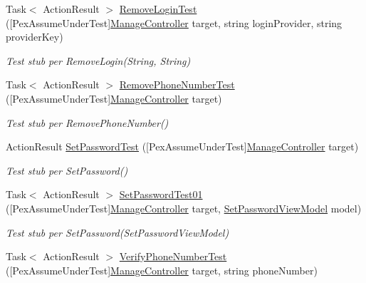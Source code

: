 \begin{DoxyCompactItemize}
Task$<$ Action\+Result $>$ \mbox{\hyperlink{class_brew_day2_1_1_tests_1_1_manage_controller_test_aa23d7412cfef8dd01b2a836cfd018265}{Remove\+Login\+Test}} (\mbox{[}Pex\+Assume\+Under\+Test\mbox{]}\mbox{\hyperlink{class_brew_day2_1_1_controllers_1_1_manage_controller}{Manage\+Controller}} target, string login\+Provider, string provider\+Key)
\begin{DoxyCompactList}\small\item\em Test stub per Remove\+Login(\+String, String)\end{DoxyCompactList}\item 
Task$<$ Action\+Result $>$ \mbox{\hyperlink{class_brew_day2_1_1_tests_1_1_manage_controller_test_a746f27b8cb41891df480fd36d6a0dcfd}{Remove\+Phone\+Number\+Test}} (\mbox{[}Pex\+Assume\+Under\+Test\mbox{]}\mbox{\hyperlink{class_brew_day2_1_1_controllers_1_1_manage_controller}{Manage\+Controller}} target)
\begin{DoxyCompactList}\small\item\em Test stub per Remove\+Phone\+Number()\end{DoxyCompactList}\item 
Action\+Result \mbox{\hyperlink{class_brew_day2_1_1_tests_1_1_manage_controller_test_ae9e8878a4839d48b5402c102bf4bd80f}{Set\+Password\+Test}} (\mbox{[}Pex\+Assume\+Under\+Test\mbox{]}\mbox{\hyperlink{class_brew_day2_1_1_controllers_1_1_manage_controller}{Manage\+Controller}} target)
\begin{DoxyCompactList}\small\item\em Test stub per Set\+Password()\end{DoxyCompactList}\item 
Task$<$ Action\+Result $>$ \mbox{\hyperlink{class_brew_day2_1_1_tests_1_1_manage_controller_test_afc6cfe682f6735059975b9c34bc9dba0}{Set\+Password\+Test01}} (\mbox{[}Pex\+Assume\+Under\+Test\mbox{]}\mbox{\hyperlink{class_brew_day2_1_1_controllers_1_1_manage_controller}{Manage\+Controller}} target, \mbox{\hyperlink{class_brew_day2_1_1_models_1_1_set_password_view_model}{Set\+Password\+View\+Model}} model)
\begin{DoxyCompactList}\small\item\em Test stub per Set\+Password(\+Set\+Password\+View\+Model)\end{DoxyCompactList}\item 
Task$<$ Action\+Result $>$ \mbox{\hyperlink{class_brew_day2_1_1_tests_1_1_manage_controller_test_a0e728921fb4497e7ddb27a1bbe918c59}{Verify\+Phone\+Number\+Test}} (\mbox{[}Pex\+Assume\+Under\+Test\mbox{]}\mbox{\hyperlink{class_brew_day2_1_1_controllers_1_1_manage_controller}{Manage\+Controller}} target, string phone\+Number)

\end{DoxyCompactItemize}
